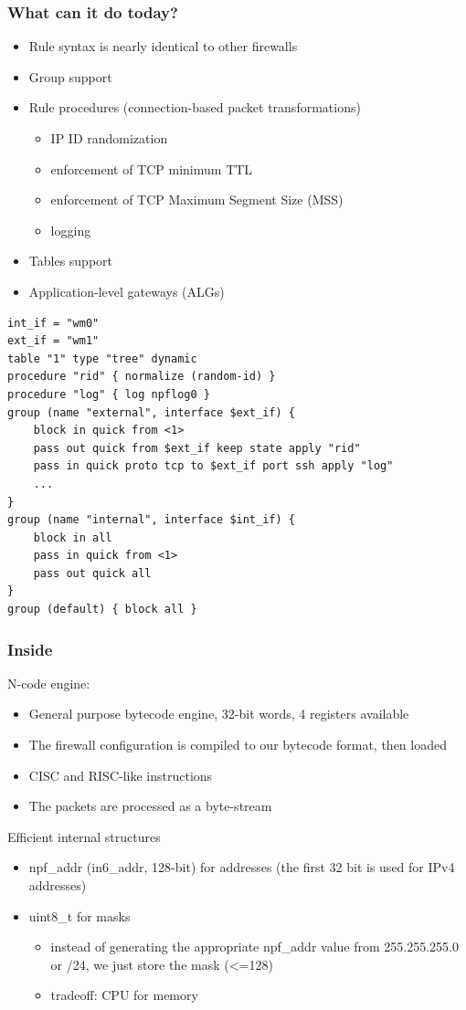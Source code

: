 \documentclass{beamer}
\begin{document}
\begin{frame}
\frametitle{What can it do today?}
\begin{itemize}
	\item Rule syntax is nearly identical to other firewalls
	\item Group support
	\item Rule procedures (connection-based packet transformations)
	\begin{itemize}
		\item IP ID randomization
		\item enforcement of TCP minimum TTL
		\item enforcement of TCP Maximum Segment Size (MSS)
		\item logging
	\end{itemize}
	\item Tables support
	\item Application-level gateways (ALGs)
\end{itemize}
\end{frame}

\begin{frame}[fragile,basicstyle=\ttfamily]
\begin{verbatim}
int_if = "wm0"
ext_if = "wm1"
table "1" type "tree" dynamic
procedure "rid" { normalize (random-id) }
procedure "log" { log npflog0 }
group (name "external", interface $ext_if) {
    block in quick from <1>
    pass out quick from $ext_if keep state apply "rid"
    pass in quick proto tcp to $ext_if port ssh apply "log"
    ...
}
group (name "internal", interface $int_if) {
    block in all
    pass in quick from <1>
    pass out quick all
}
group (default) { block all }
\end{verbatim}
\end{frame}

\begin{frame}
\frametitle{Inside}
N-code engine:
\begin{itemize}
	\item General purpose bytecode engine, 32-bit words, 4 registers available
	\item The firewall configuration is compiled to our bytecode format, then loaded
	\item CISC and RISC-like instructions
	\item The packets are processed as a byte-stream
\end{itemize}
Efficient internal structures
\begin{itemize}
	\item npf\_addr (in6\_addr, 128-bit) for addresses (the first 32 bit is used for IPv4 addresses)
	\item uint8\_t for masks
	\begin{itemize}
		\item instead of generating the appropriate npf\_addr value from  255.255.255.0 or /24, we just store
the mask (<=128)
		\item tradeoff: CPU for memory
	\end{itemize}
\end{itemize}
\end{frame}
\end{document}
